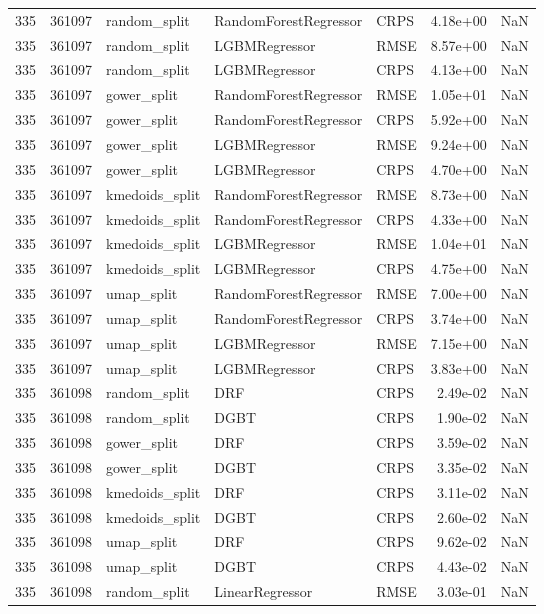 \begin{tabular}{rrlllrr}
335 & 361097 & random\_split & RandomForestRegressor & CRPS & 4.18e+00 & NaN \\
335 & 361097 & random\_split & LGBMRegressor & RMSE & 8.57e+00 & NaN \\
335 & 361097 & random\_split & LGBMRegressor & CRPS & 4.13e+00 & NaN \\
335 & 361097 & gower\_split & RandomForestRegressor & RMSE & 1.05e+01 & NaN \\
335 & 361097 & gower\_split & RandomForestRegressor & CRPS & 5.92e+00 & NaN \\
335 & 361097 & gower\_split & LGBMRegressor & RMSE & 9.24e+00 & NaN \\
335 & 361097 & gower\_split & LGBMRegressor & CRPS & 4.70e+00 & NaN \\
335 & 361097 & kmedoids\_split & RandomForestRegressor & RMSE & 8.73e+00 & NaN \\
335 & 361097 & kmedoids\_split & RandomForestRegressor & CRPS & 4.33e+00 & NaN \\
335 & 361097 & kmedoids\_split & LGBMRegressor & RMSE & 1.04e+01 & NaN \\
335 & 361097 & kmedoids\_split & LGBMRegressor & CRPS & 4.75e+00 & NaN \\
335 & 361097 & umap\_split & RandomForestRegressor & RMSE & 7.00e+00 & NaN \\
335 & 361097 & umap\_split & RandomForestRegressor & CRPS & 3.74e+00 & NaN \\
335 & 361097 & umap\_split & LGBMRegressor & RMSE & 7.15e+00 & NaN \\
335 & 361097 & umap\_split & LGBMRegressor & CRPS & 3.83e+00 & NaN \\
335 & 361098 & random\_split & DRF & CRPS & 2.49e-02 & NaN \\
335 & 361098 & random\_split & DGBT & CRPS & 1.90e-02 & NaN \\
335 & 361098 & gower\_split & DRF & CRPS & 3.59e-02 & NaN \\
335 & 361098 & gower\_split & DGBT & CRPS & 3.35e-02 & NaN \\
335 & 361098 & kmedoids\_split & DRF & CRPS & 3.11e-02 & NaN \\
335 & 361098 & kmedoids\_split & DGBT & CRPS & 2.60e-02 & NaN \\
335 & 361098 & umap\_split & DRF & CRPS & 9.62e-02 & NaN \\
335 & 361098 & umap\_split & DGBT & CRPS & 4.43e-02 & NaN \\
335 & 361098 & random\_split & LinearRegressor & RMSE & 3.03e-01 & NaN \\

\end{tabular}
